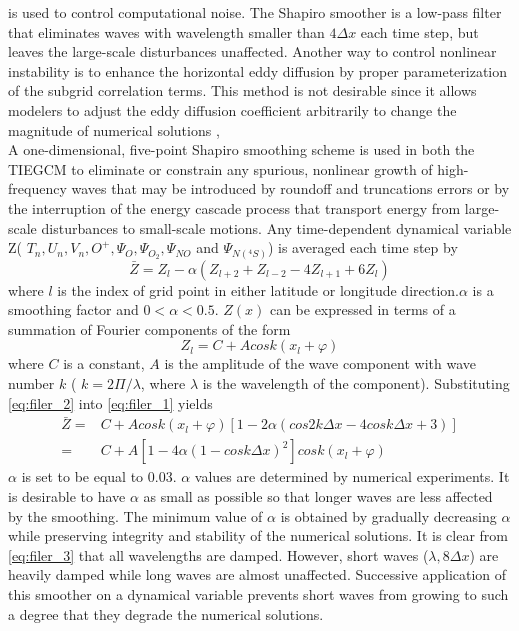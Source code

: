 is used to control computational noise. The Shapiro smoother is 
a low-pass filter that eliminates waves with wavelength smaller 
than $4 \Delta x$ each time step, but leaves the large-scale disturbances 
unaffected. Another way to control nonlinear instability is to 
enhance the horizontal eddy diffusion by proper parameterization 
of the subgrid correlation terms. This method is not desirable 
since it allows modelers to adjust the eddy diffusion coefficient 
arbitrarily to change the magnitude of numerical solutions 
\cite{tag1979},\\
%
 A one-dimensional, five-point Shapiro smoothing scheme is 
 used in both the TIEGCM to eliminate or constrain any spurious, 
 nonlinear growth of high-frequency waves that may be introduced 
 by roundoff and truncations errors or by the interruption of the 
 energy cascade process that transport energy from large-scale 
 disturbances to small-scale motions. Any time-dependent 
 dynamical variable Z( $T_n, U_n, V_n, O^+, \Psi_O, \Psi_{O_2},
\Psi_{NO}$  and  $\Psi_{N(^4S)}$) is averaged each time 
 step by
%
\begin{equation}
  \bar{Z} = Z_l - \alpha(Z_{l+2}+ Z_{l-2}-4 Z_{l+1}+6 Z_{l})
    \label{eq:filer_1}
\end{equation}
% 
where $l$ is the index of grid point in either latitude or 
longitude direction.$\alpha$  is a smoothing factor and $0 < \alpha < 0.5$.
$Z(x)$  can 
be expressed in terms of a summation of Fourier components of the form
%
\begin{equation}
  Z_l = C+A cos k(x_l + \varphi)
    \label{eq:filer_2}
\end{equation}
% 
where $C$ is a constant, $A$ is the amplitude of the wave 
component with wave number $k$ ( $k=2\Pi/\lambda$, where 
$\lambda$  is the wavelength of 
the component). Substituting \ref{eq:filer_2} into \ref{eq:filer_1} yields
%
\begin{equation}
  \begin{split}
  \bar{Z} = & C + A cos k(x_l + \varphi) [1- 2 \alpha(cos 2 k \Delta x - 4 cos k
  \Delta x + 3)]  \\
  =&  C + A[1-4 \alpha(1-cos k \Delta x)^2]cos k(x_l + \varphi)
  \end{split}
    \label{eq:filer_3}
\end{equation}
% 
$\alpha$ is set to be equal to 0.03. $\alpha$  values are determined 
 by numerical experiments. It is desirable to have $\alpha$  as 
 small as possible so that longer waves are less affected 
 by the smoothing. The minimum value of $\alpha$  is obtained by 
 gradually decreasing $\alpha$  while preserving integrity and 
 stability of the numerical solutions. 
% 
It is clear from \ref{eq:filer_3} that all wavelengths are 
damped. However, short waves ($\lambda , 8 \Delta x$) are heavily damped while long 
waves are almost unaffected. Successive application of this 
smoother on a dynamical variable prevents short waves from 
growing to such a degree that they degrade the numerical 
solutions.
%

